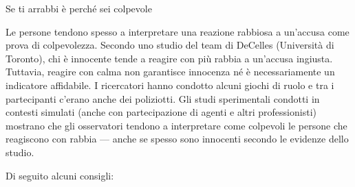\documentclass[12pt]{book} %
\begin{document}
\begin{mdframed}[linewidth=1pt]
Se ti arrabbi è perché sei colpevole

Le persone tendono spesso a interpretare una reazione rabbiosa a un'accusa come prova di colpevolezza. Secondo uno studio del team di DeCelles (Università di Toronto), chi è innocente tende a reagire con più rabbia a un'accusa ingiusta. Tuttavia, reagire con calma non garantisce innocenza né è necessariamente un indicatore affidabile. I ricercatori hanno condotto alcuni giochi di ruolo e
tra i partecipanti c'erano anche dei poliziotti. Gli studi sperimentali condotti in contesti simulati (anche con partecipazione di agenti e altri professionisti) mostrano che gli osservatori tendono a interpretare come colpevoli le persone che reagiscono con rabbia — anche se spesso sono innocenti secondo le evidenze dello studio. 
\end{mdframed}

Di seguito alcuni consigli:
\end{document}
